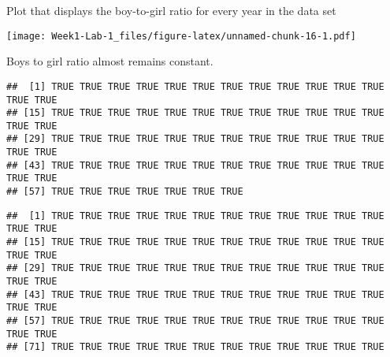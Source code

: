 \documentclass[]{article}
\newenvironment{Shaded}{\begin{snugshade}}{\end{snugshade}}
\newcommand{\DataTypeTok}[1]{\textcolor[rgb]{0.13,0.29,0.53}{#1}}
\newcommand{\KeywordTok}[1]{\textcolor[rgb]{0.13,0.29,0.53}{\textbf{#1}}}
\newcommand{\NormalTok}[1]{#1}
\newcommand{\OperatorTok}[1]{\textcolor[rgb]{0.81,0.36,0.00}{\textbf{#1}}}
\newcommand{\StringTok}[1]{\textcolor[rgb]{0.31,0.60,0.02}{#1}}
\begin{document}
Plot that displays the boy-to-girl ratio for every year in the data set

\begin{Shaded}
\end{Shaded}

\texttt{[image: Week1-Lab-1\_files/figure-latex/unnamed-chunk-16-1.pdf]}

Boys to girl ratio almost remains constant.

\begin{Shaded}
\end{Shaded}

\begin{verbatim}
##  [1] TRUE TRUE TRUE TRUE TRUE TRUE TRUE TRUE TRUE TRUE TRUE TRUE TRUE TRUE
## [15] TRUE TRUE TRUE TRUE TRUE TRUE TRUE TRUE TRUE TRUE TRUE TRUE TRUE TRUE
## [29] TRUE TRUE TRUE TRUE TRUE TRUE TRUE TRUE TRUE TRUE TRUE TRUE TRUE TRUE
## [43] TRUE TRUE TRUE TRUE TRUE TRUE TRUE TRUE TRUE TRUE TRUE TRUE TRUE TRUE
## [57] TRUE TRUE TRUE TRUE TRUE TRUE TRUE
\end{verbatim}

\begin{Shaded}
\end{Shaded}

\begin{verbatim}
##  [1] TRUE TRUE TRUE TRUE TRUE TRUE TRUE TRUE TRUE TRUE TRUE TRUE TRUE TRUE
## [15] TRUE TRUE TRUE TRUE TRUE TRUE TRUE TRUE TRUE TRUE TRUE TRUE TRUE TRUE
## [29] TRUE TRUE TRUE TRUE TRUE TRUE TRUE TRUE TRUE TRUE TRUE TRUE TRUE TRUE
## [43] TRUE TRUE TRUE TRUE TRUE TRUE TRUE TRUE TRUE TRUE TRUE TRUE TRUE TRUE
## [57] TRUE TRUE TRUE TRUE TRUE TRUE TRUE TRUE TRUE TRUE TRUE TRUE TRUE TRUE
## [71] TRUE TRUE TRUE TRUE TRUE TRUE TRUE TRUE TRUE TRUE TRUE TRUE
\end{verbatim}
\end{document}
